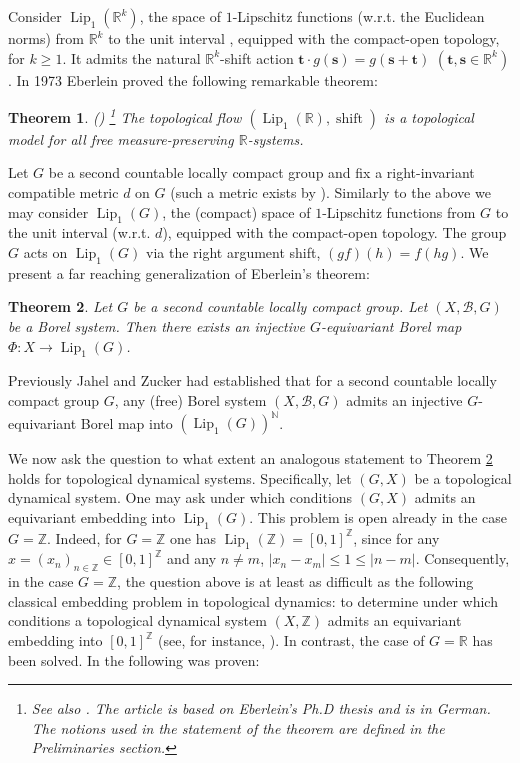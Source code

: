 \documentclass[11pt]{article}
\theoremstyle{plain}
\newtheorem{thm}{Theorem}[section]
\theoremstyle{definition}
\DeclareMathOperator{\Lip}{Lip}
\DeclareMathOperator{\shift}{shift}
\def\R{\mathbb{R}}
\def\Rk{\mathbb{R}^k}
\def\N{\mathbb{N}}
\def\Z{\mathbb{Z}}
\def\tt{\mathbf t}
\def\ss{\mathbf s}
\numberwithin{figure}{section}
\begin{document}
Consider $\Lip_{1}(\Rk)$, the space of $1$-Lipschitz functions (w.r.t. the Euclidean norms) from $\Rk$ to the unit interval , equipped with the compact-open topology, for $k\geq 1$. It admits the natural $\Rk$-shift action $\tt\cdot g( \ss)=g(\ss+\tt)$ $(\tt,\mathbf s \in \R^k)$. In 1973 Eberlein proved the following remarkable theorem:

\begin{thm}(\cite[Theorem 3.1]{Ebe73})
\label{Eberlein}\footnote{See also \cite[Section 2.4]{EFKKS17}. The article \cite{Ebe73} is based on Eberlein's Ph.D thesis and is in German. The notions used in the statement of the theorem are defined in the Preliminaries section.}
The topological flow $(\Lip_{1}(\R),\shift)$ is a topological model for all free measure-preserving $\mathbb{R}$-systems.
\end{thm}
\noindent
Let $G$ be a second countable locally compact group and fix a right-invariant compatible metric $d$ on $G$ (such a metric exists by \cite{struble1974metrics}). Similarly to the above we may consider $\Lip_{1}(G)$, the (compact) space of $1$-Lipschitz functions from $G$ to the unit interval (w.r.t. $d$), equipped with the compact-open topology. The group $G$ acts on $\Lip_1(G)$ via the right argument shift, $(gf)(h)=f(hg)$.
We present a far reaching generalization of Eberlein's theorem:


\begin{thm}\label{thm:LCSC_Eberlein}
  Let $G$ be a second countable locally compact group.  Let $(X,\mathcal{B}, G)$ be a Borel system. Then there exists an injective $G$-equivariant Borel map $\Phi:X\to\Lip_1(G)$.
\end{thm}
Previously  Jahel and Zucker \cite[Theorem 12]{JZ21} had established  that for a second countable locally compact group $G$, any (free) Borel system $(X,\mathcal{B}, G)$ admits an injective $G$-equivariant Borel map into $(\Lip_1(G))^{\N}$. 

We now ask the question to what extent an analogous statement to Theorem \ref{thm:LCSC_Eberlein} holds for topological dynamical systems. 
Specifically, let $(G,X)$ be a topological dynamical system. One may ask under which conditions $(G,X)$ admits an equivariant embedding into $\Lip_1(G)$. This problem is open already in the case $G=\Z$. Indeed, for $G=\Z$ one has $\Lip_1(\Z) = [0,1]^\Z$, since for any $x=(x_n)_{n\in \Z}\in [0,1]^\Z$ and any $n\neq m$, $|x_n-x_m|\leq 1 \leq |n-m|$. Consequently, in the case $G=\Z$, the question above is at least as difficult as the following classical embedding problem in topological dynamics: to determine under which conditions a topological dynamical system $(X,\Z)$ admits an equivariant embedding into $[0,1]^\Z$ (see, for instance, \cite{LT12,GQS18,gutman2020embedding,dranishnikov2025free}). 
In contrast, the case of $G=\R$ has been solved. In \cite{GJT19} the following  was proven:
\end{document}
